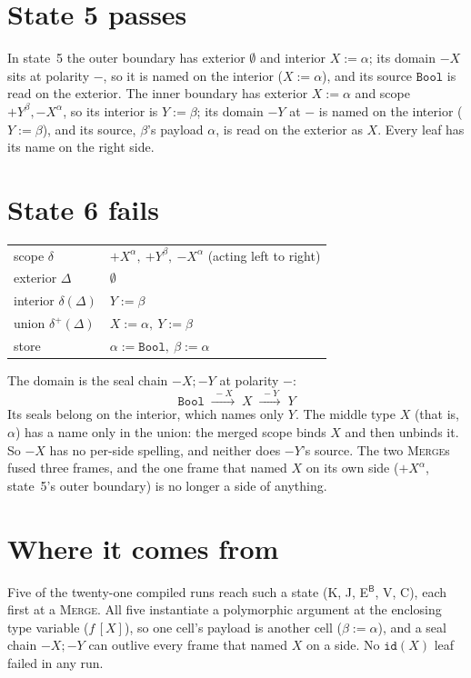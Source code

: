 \documentclass[11pt]{article}
\newcommand{\key}[1]{\mathtt{#1}}
\newcommand{\id}[1]{\key{id}(#1)}
\newcommand{\seal}[1]{-#1}
\newcommand{\Bool}{\key{Bool}}
\newcommand{\by}{{:=}}
\newcommand{\bnd}[1]{{+#1}}
\newcommand{\ubnd}[1]{{-#1}}
\begin{document}
\section*{State 5 passes}

In state~5 the outer boundary has exterior $\emptyset$ and interior
$X \by \alpha$; its domain $\seal{X}$ sits at polarity $-$, so it is
named on the interior ($X \by \alpha$), and its source $\Bool$ is
read on the exterior.  The inner boundary has exterior $X \by \alpha$
and scope $\bnd{Y}^\beta, \ubnd{X}^\alpha$, so its interior is
$Y \by \beta$; its domain $\seal{Y}$ at $-$ is named on the interior
($Y \by \beta$), and its source, $\beta$'s payload $\alpha$, is read on
the exterior as $X$.  Every leaf has its name on the right side.

\section*{State 6 fails}

\begin{center}
\renewcommand{\arraystretch}{1.3}
\begin{tabular}{ll}
  scope $\delta$ & $\bnd{X}^\alpha,\ \bnd{Y}^\beta,\ \ubnd{X}^\alpha$
    \quad (acting left to right) \\
  exterior $\Delta$ & $\emptyset$ \\
  interior $\delta(\Delta)$ & $Y \by \beta$ \\
  union $\delta^{+}(\Delta)$ & $X \by \alpha,\ Y \by \beta$ \\
  store & $\alpha \by \Bool,\ \beta \by \alpha$
\end{tabular}
\end{center}

The domain is the seal chain $\seal{X} ; \seal{Y}$ at polarity $-$:
\[
  \Bool \;\xrightarrow{\;\seal{X}\;}\; X
        \;\xrightarrow{\;\seal{Y}\;}\; Y
\]
Its seals belong on the interior, which names only $Y$.  The middle type
$X$ (that is, $\alpha$) has a name only in the union: the merged scope
binds $X$ and then unbinds it.  So $\seal{X}$ has no per-side
spelling, and neither does $\seal{Y}$'s source.  The two
\textsc{Merge}s fused three frames, and the one frame that named $X$
on its own side ($\bnd{X}^\alpha$, state~5's outer boundary) is no longer
a side of anything.

\section*{Where it comes from}

Five of the twenty-one compiled runs reach such a state (K, J,
E$^{\mathsf{B}}$, V, C), each first at a \textsc{Merge}.  All five
instantiate a polymorphic argument at the enclosing type variable
($f\,[X]$), so one cell's payload is another cell ($\beta \by \alpha$),
and a seal chain $\seal{X} ; \seal{Y}$ can outlive every frame that named
$X$ on a side.  No $\id{X}$ leaf failed in any run.
\end{document}
